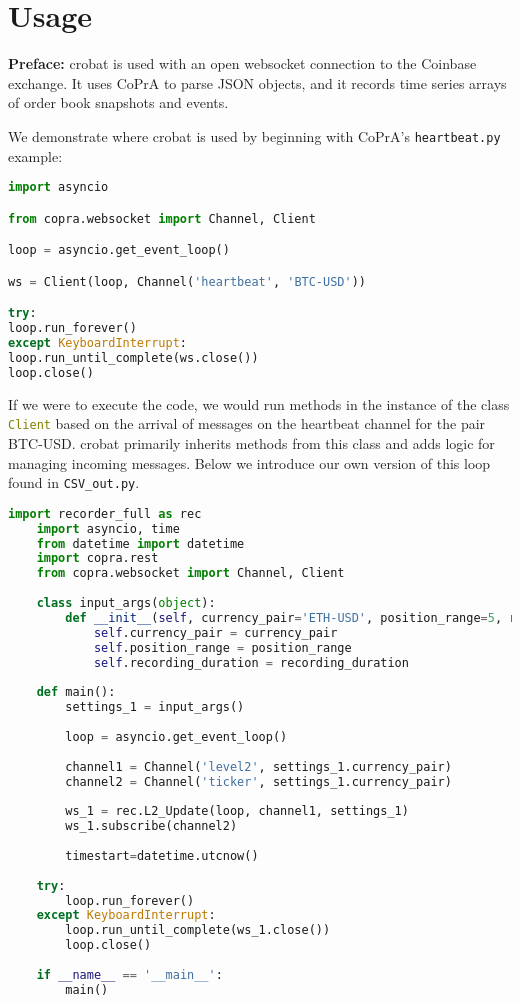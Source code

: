 \section{Usage}

\textbf{Preface:} crobat is used with an open websocket connection to the Coinbase exchange. It uses CoPrA to parse JSON objects, and it records time series arrays of order book snapshots and events. \hfill\break

We demonstrate where crobat is used by beginning with CoPrA's \texttt{heartbeat.py} example:

\begin{lstlisting}[language=Python]
import asyncio

from copra.websocket import Channel, Client

loop = asyncio.get_event_loop()

ws = Client(loop, Channel('heartbeat', 'BTC-USD'))

try:
loop.run_forever()
except KeyboardInterrupt:
loop.run_until_complete(ws.close())
loop.close()
\end{lstlisting}

If we were to execute the code, we would run methods in the instance of the class \textcolor{olive}{\texttt{Client}} based on the arrival of messages on the heartbeat channel for the pair BTC-USD. crobat primarily inherits methods from this class and adds logic for managing incoming messages. Below we introduce our own version of this loop found in \texttt{CSV\_out.py}.

\begin{lstlisting}[language=Python]
	import recorder_full as rec
	import asyncio, time
	from datetime import datetime
	import copra.rest
	from copra.websocket import Channel, Client
	
	class input_args(object):
		def __init__(self, currency_pair='ETH-USD', position_range=5, recording_duration=5):
			self.currency_pair = currency_pair
			self.position_range = position_range
			self.recording_duration = recording_duration
	
	def main():
		settings_1 = input_args()
	
		loop = asyncio.get_event_loop()
	
		channel1 = Channel('level2', settings_1.currency_pair) 
		channel2 = Channel('ticker', settings_1.currency_pair)
	
		ws_1 = rec.L2_Update(loop, channel1, settings_1)
		ws_1.subscribe(channel2)
	
		timestart=datetime.utcnow()
	
	try:     
		loop.run_forever()
	except KeyboardInterrupt:
		loop.run_until_complete(ws_1.close())
		loop.close()
	
	if __name__ == '__main__':
		main()
\end{lstlisting}

